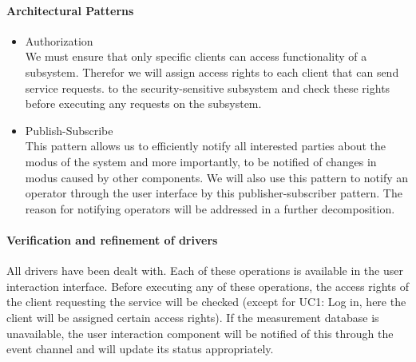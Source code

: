 \paragraph{Architectural Patterns}
\begin{itemize}
	\item Authorization\\
	We must ensure that only specific clients can access functionality of a subsystem.
	Therefor we will assign access rights to each client that can send service requests.
	to the security-sensitive subsystem and check these rights before executing any requests
	on the subsystem.
	\item Publish-Subscribe\\
	This pattern allows us to efficiently notify all interested parties
		about the modus of the system and more importantly, to be notified of changes in modus caused by other components. We will also use this pattern to
		notify an operator through the user interface by this publisher-subscriber
		pattern. The reason for notifying operators will be addressed in a further decomposition.
\end{itemize}

\paragraph{Verification and refinement of drivers}
All drivers have been dealt with. Each of these operations is available in the user interaction interface.
Before executing any of these operations, the access rights of the client requesting the service will be checked
(except for UC1: Log in, here the client will be assigned certain access rights).
If the measurement database is unavailable, the user interaction component will be notified of this through
	the event channel and will update its status appropriately.
